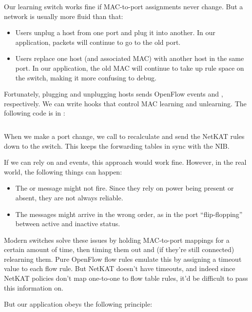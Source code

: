 Our learning switch works fine if MAC-to-port assignments never change.  But a network is usually
more fluid than that:

\begin{itemize}
\item Users unplug a host from one port and plug it into another.  In our application, packets will
continue to go to the old port.
\item Users replace one host (and associated MAC) with another host in the same port.  In our application, the
old MAC will continue to take up rule space on the switch, making it more confusing to debug. 
\end{itemize}

Fortunately, plugging and unplugging hosts sends OpenFlow events  and ,
respectively.  We can write hooks that control MAC learning and unlearning.  The following
code is in :

\inputminted[firstline=60,lastline=69]{python}{code/l2_learning_switch/learning4.py}

When we make a port change, we call  to recalculate and send the NetKAT rules down to the 
switch.  This keeps the forwarding tables in sync with the NIB.  

If we can rely on  and  events, this approach would work fine.
However, in the real world, the following things can happen:

\begin{itemize}
\item The  or  message might not fire.  Since they rely on power being
present or absent, they are not always reliable.
\item The messages might arrive in the wrong order, as in the port ``flip-flopping'' between active and 
inactive status.
\end{itemize}

Modern switches solve these issues by holding MAC-to-port mappings for a certain amount of time, then 
timing them out and (if they're still connected) relearning them.  Pure OpenFlow flow rules emulate
this by assigning a timeout value to each flow rule.   But NetKAT doesn't have timeouts, and indeed since
NetKAT policies don't map one-to-one to flow table rules, it'd be difficult to pass this information on.

But our application obeys the following principle:

\setcounter{principle}{4}


